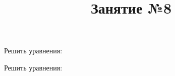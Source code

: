 \title{Занятие №8}
\begin{listofex}
	\item Решить уравнения:
	\begin{enumcols}[itemcolumns=2]
		\item {}
		\item {}
		\item {}
		\item {}
		\item {}
		\item {}
		\item {}
	\end{enumcols}
	\item Решить уравнения:
	\begin{enumcols}[itemcolumns=2]
		\item {}
		\item {}
		\item {}
		\item {}
	\end{enumcols}
	\item {}
	\item {}
	\item {}
	\item {}
\end{listofex}